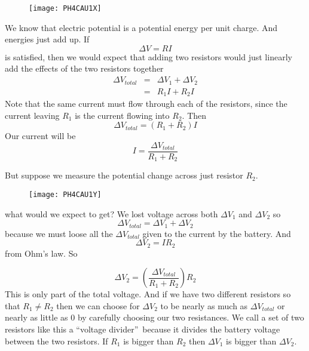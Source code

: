 \begin{figure}[h!]
\texttt{[image: PH4CAU1X]}
\end{figure}We know that electric potential
is a potential energy per unit charge. And energies just add up. If 
\begin{equation*}
\Delta V=RI
\end{equation*}%
is satisfied, then we would expect that adding two resistors would just
linearly add the effects of the two resistors together%
\begin{eqnarray*}
\Delta V_{total} &=&\Delta V_{1}+\Delta V_{2} \\
&=&R_{1}I+R_{2}I
\end{eqnarray*}%
Note that the same current must flow through each of the resistors, since
the current leaving $R_{1}$ is the current flowing into $R_{2}.$ Then 
\begin{equation*}
\Delta V_{total}=\left( R_{1}+R_{2}\right) I
\end{equation*}%
Our current will be 
\begin{equation*}
I=\frac{\Delta V_{total}}{R_{1}+R_{2}}
\end{equation*}

But suppose we measure the potential change across just resistor $R_{2}.$ 
\begin{figure}[h!]
\texttt{[image: PH4CAU1Y]}
\end{figure}what would we expect to get? We
lost voltage across both $\Delta V_{1}$ and $\Delta V_{2}$ so 
\begin{equation*}
\Delta V_{total}=\Delta V_{1}+\Delta V_{2}
\end{equation*}%
because we must loose all the $\Delta V_{total}$ given to the current by the
battery. And 
\begin{equation*}
\Delta V_{2}=IR_{2}
\end{equation*}%
from Ohm's law. So

\begin{equation*}
\Delta V_{2}=\left( \frac{\Delta V_{total}}{R_{1}+R_{2}}\right) R_{2}
\end{equation*}%
This is only part of the total voltage. And if we have two different
resistors so that $R_{1}\neq R_{2}$ then we can choose for $\Delta V_{2}$ to
be nearly as much as $\Delta V_{total}$ or nearly as little as $0$ by
carefully choosing our two resistances. We call a set of two resistors like
this a \textquotedblleft voltage divider\textquotedblright\ because it
divides the battery voltage between the two resistors. If $R_{1}$ is bigger
than $R_{2}$ then $\Delta V_{1}$ is bigger than $\Delta V_{2}.$

